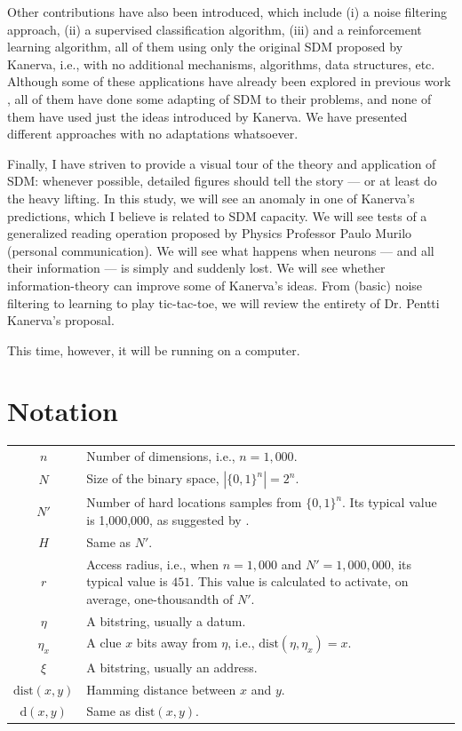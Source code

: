 Other contributions have also been introduced, which include (i) a noise filtering approach, (ii) a supervised classification algorithm, (iii) and a reinforcement learning algorithm, all of them using only the original SDM proposed by Kanerva, i.e., with no additional mechanisms, algorithms, data structures, etc. Although some of these applications have already been explored in previous work \citep{Meng2009, fan1997genetic, rao1995natural}, all of them have done some adapting of SDM to their problems, and none of them have used just the ideas introduced by Kanerva. We have presented different approaches with no adaptations whatsoever.

Finally, I have striven to provide a visual tour of the theory and application of SDM: whenever possible, detailed figures should tell the story --- or at least do the heavy lifting. In this study, we will see an anomaly in one of Kanerva's predictions, which I believe is related to SDM capacity. We will see tests of a generalized reading operation proposed by Physics Professor Paulo Murilo (personal communication).  We will see what happens when neurons --- and
all their information --- is simply and suddenly lost.  We will see whether information-theory can improve some of Kanerva's ideas.  From (basic) noise filtering to learning to play tic-tac-toe, we will review the entirety of Dr. Pentti Kanerva's proposal.

This time, however, it will be running on a computer.

\chapter{Notation}

\begin{tabular}{cp{\textwidth}}
  $n$ & Number of dimensions, i.e., $n=1,000$. \\
  $N$ & Size of the binary space, $|\{0, 1\}^n| = 2^n$. \\
  $N'$ & Number of hard locations samples from $\{0, 1\}^n$. Its typical value is 1,000,000, as suggested by \citet{Kanerva1988}. \\
  $H$ & Same as $N'$. \\
  $r$ & Access radius, i.e., when $n=1,000$ and $N'=1,000,000$, its typical value is $451$. This value is calculated to activate, on average, one-thousandth of $N'$. \\
  $\eta$ & A bitstring, usually a datum. \\
  $\eta_x$ & A clue $x$ bits away from $\eta$, i.e., $\text{dist}(\eta, \eta_x) = x$. \\
  $\xi$ & A bitstring, usually an address. \\
  $\text{dist}(x, y)$ & Hamming distance between $x$ and $y$. \\
  $\text{d}(x, y)$ & Same as $\text{dist}(x, y)$.
\end{tabular}\\

